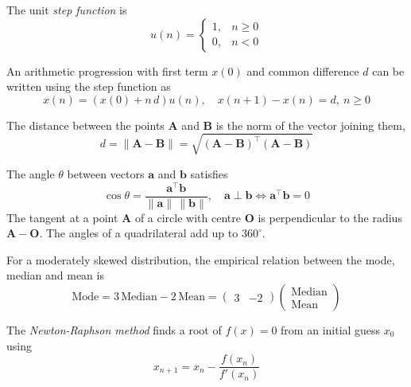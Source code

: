 \item The unit \emph{step function} is
\begin{equation}
u(n) = \begin{cases} 1, & n \ge 0 \\ 0, & n < 0 \end{cases}
\label{c10eq:step}
\end{equation}

\item An arithmetic progression with first term $x(0)$ and common difference $d$ can be written using the step function as
\begin{equation}
x(n) = \left(x(0) + n\,d\right)u(n), \quad x(n+1) - x(n) = d, \ n \ge 0
\label{c10eq:ap}
\end{equation}

\item The distance between the points $\mathbf{A}$ and $\mathbf{B}$ is the norm of the vector joining them,
\begin{equation}
d = \|\mathbf{A} - \mathbf{B}\| = \sqrt{(\mathbf{A} - \mathbf{B})^{\top}(\mathbf{A} - \mathbf{B})}
\label{c10eq:dist}
\end{equation}

\item The angle $\theta$ between vectors $\mathbf{a}$ and $\mathbf{b}$ satisfies
\begin{equation}
\cos\theta = \frac{\mathbf{a}^{\top}\mathbf{b}}{\|\mathbf{a}\|\,\|\mathbf{b}\|}, \quad
\mathbf{a} \perp \mathbf{b} \iff \mathbf{a}^{\top}\mathbf{b} = 0
\label{c10eq:angle}
\end{equation}
The tangent at a point $\mathbf{A}$ of a circle with centre $\mathbf{O}$ is perpendicular to the radius $\mathbf{A}-\mathbf{O}$. The angles of a quadrilateral add up to $360^{\circ}$.

\item For a moderately skewed distribution, the empirical relation between the mode, median and mean is
\begin{equation}
\text{Mode} = 3\,\text{Median} - 2\,\text{Mean} = \begin{pmatrix} 3 & -2 \end{pmatrix}\begin{pmatrix} \text{Median} \\ \text{Mean} \end{pmatrix}
\label{c10eq:mode}
\end{equation}

\item The \emph{Newton-Raphson method} finds a root of $f(x) = 0$ from an initial guess $x_0$ using
\begin{equation}
x_{n+1} = x_n - \frac{f(x_n)}{f'(x_n)}
\label{c10eq:newton}
\end{equation}

